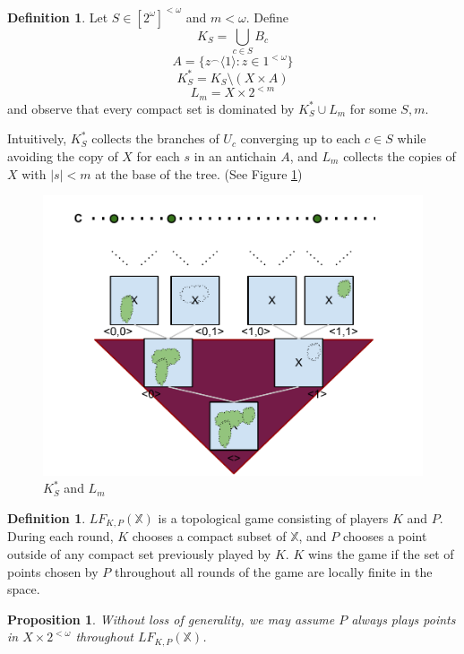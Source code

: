 \documentclass[11pt]{article}
\theoremstyle{plain}
\newtheorem{proposition}[theorem]{Proposition}
\theoremstyle{definition}
\newtheorem{definition}[theorem]{Definition}
\theoremstyle{remark}
\newcommand{\lfkpgame}[1]{LF_{K,P}(#1)}
\newcommand{\<}{\langle}
\renewcommand{\>}{\rangle}
\begin{document}
\begin{definition}
Let $S\in[2^\omega]^{<\omega}$ and $m<\omega$. Define 
  \[
    K_S = \bigcup_{c \in S} B_c
  \] 
  \[ 
    A = \{z^\frown \<1\> : z \in 1^{<\omega}\}
  \] 
  \[ 
    K^*_S = K_S \setminus (X \times A)
  \] 
  \[
    L_m = X \times 2^{<m}
  \] 
and observe that every compact set is dominated by $K^*_S \cup L_m$ for some $S,m$.

Intuitively, $K^*_S$ collects the branches of $U_c$ converging up to each $c \in S$ while avoiding the copy of $X$ for each $s$ in an antichain $A$, and $L_m$ collects the copies of $X$ with $|s| < m$ at the base of the tree. (See Figure \ref{fig:cantor_tree_compact})
\end{definition}

\begin{figure}[p]
  \centering
  \includegraphics[width=6in]{cantor_tree_compact.pdf}
  \caption{$K^*_S$ and $L_m$}
  \label{fig:cantor_tree_compact}
\end{figure}

\begin{definition}
$\lfkpgame{\mathbb{X}}$ is a topological game consisting of players $K$ and $P$. During each round, $K$ chooses a compact subset of $\mathbb{X}$, and $P$ chooses a point outside of any compact set previously played by $K$. $K$ wins the game if the set of points chosen by $P$ throughout all rounds of the game are locally finite in the space.
\end{definition}

\begin{proposition}
Without loss of generality, we may assume $P$ always plays points in $X \times 2^{<\omega}$ throughout $\lfkpgame{\mathbb{X}}$.
\end{proposition}
\end{document}
